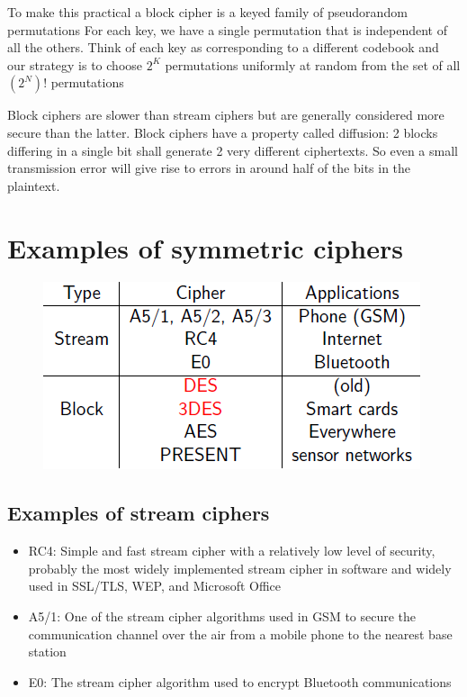 To make this practical a block cipher is a keyed family of pseudorandom permutations For each key, we have a single permutation that is independent of all the others. Think of each key as corresponding to a different codebook and our strategy is to choose $2^K$ permutations uniformly at random from the set of all $(2^N)!$ permutations

Block ciphers are slower than stream ciphers but are generally considered more secure than the latter.
Block ciphers have a property called diffusion: 2 blocks differing in a single bit shall generate 2 very different ciphertexts. So even a small transmission error will give rise to errors in around half of the bits in the plaintext.


\section{Examples of symmetric ciphers}

\begin{figure}
	\centering
	\includegraphics[width=0.7\linewidth]{Images/Chapter2/screenshot003}
	\caption{}
	\label{fig:chapter2_screenshot003}
\end{figure}

\subsection{Examples of stream ciphers}
\begin{itemize}
	\item RC4: Simple and fast stream cipher with a relatively low level of security, probably the most widely implemented stream cipher in software and widely used in SSL/TLS, WEP, and Microsoft Office
	\item A5/1: One of the stream cipher algorithms used in GSM to secure the communication channel over the air from a mobile phone to the nearest base station
	\item E0: The stream cipher algorithm used to encrypt Bluetooth communications
\end{itemize}

